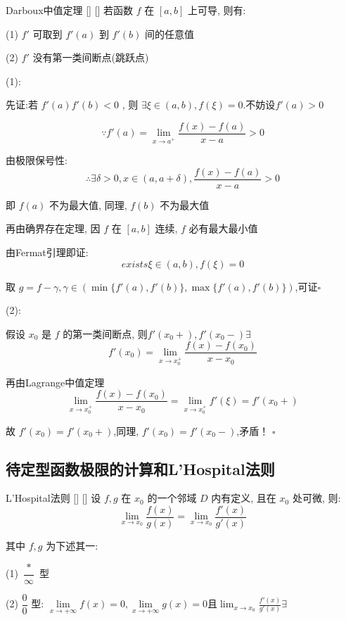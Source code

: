 \documentclass[UTF8]{ctexart}
\begin{document}
            \begin{thm}
			    []
			    {Darboux中值定理}
			    []
			    []
				若函数 \(f\) 在 \([a,b]\) 上可导, 则有: 

				(1) \(f'\) 可取到 \(f'(a)\) 到 \(f'(b)\) 间的任意值

				(2) \(f'\) 没有第一类间断点(跳跃点)
			\end{thm}

			\begin{prf}

				(1):

				先证:若 \(f'(a)f'(b)<0\) , 则 \(\exists\xi\in(a,b),f(\xi)=0\).不妨设\(f'(a)>0\)

				\[\because f'(a)=\lim\limits_{x\to a^+}\frac{f(x)-f(a)}{x-a}>0\]

				由极限保号性: 
				\[\therefore \exists\delta>0,x\in(a,a+\delta),\frac{f(x)-f(a)}{x-a}>0\]

				即 \(f(a)\) 不为最大值, 同理,  \(f(b)\) 不为最大值

				再由确界存在定理, 因 \(f\) 在 \([a,b]\) 连续,  \(f\) 必有最大最小值

				由Fermat引理即证: 
				\[exists\xi\in(a,b),f(\xi)=0\]

				取 \(g=f-\gamma,\gamma\in(\min\{f'(a),f'(b)\},\max\{f'(a),f'(b)\})\),可证\(\square\)

				(2):
				
				假设 \(x_0\) 是 \(f\) 的第一类间断点, 则\(f'(x_0+),f'(x_0-)\exists\)
				\[f'(x_0)=\lim_{x\to x_0^+}\frac{f(x)-f(x_0)}{x-x_0}\]

				再由Lagrange中值定理
				\[\lim_{x\to x_0^+}\frac{f(x)-f(x_0)}{x-x_0}=\lim_{x\to x_0^+}f'(\xi)=f'(x_0+)\]

				故 \(f'(x_0)=f'(x_0+)\),同理,  \(f'(x_0)=f'(x_0-)\),矛盾！
				\(\square\)
			\end{prf}
		
		\subsection{待定型函数极限的计算和L'Hospital法则}
		
			\begin{thm}
			    []
			    {L'Hospital法则}
			    []
			    []
				设 \(f,g\) 在 \(x_0\) 的一个邻域 \(D\) 内有定义, 且在 \(x_0\) 处可微, 则: 
				\[\lim_{x\to x_0}\frac{f(x)}{g(x)}=\lim_{x\to x_0}\frac{f'(x)}{g'(x)}\]

				其中 \(f,g\) 为下述其一:
				
				(1) \(\dfrac{*}{\infty}\) 型

				(2) \(\dfrac{0}{0}\) 型: 
				\(\lim\limits_{x\to+\infty}f(x)=0,\lim\limits_{x\to+\infty}g(x)=0\)且\(\lim_{x\to x_0}\frac{f'(x)}{g'(x)}\exists\)
				
			\end{thm}
\end{document}
